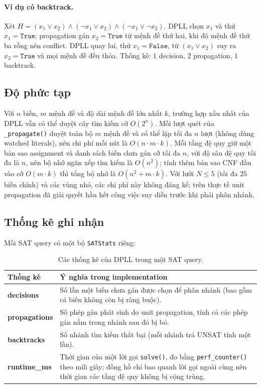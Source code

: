 \paragraph{Ví dụ có backtrack.}
Xét $H=(x_1\lor x_2)\land(\neg x_1\lor x_2)\land(\neg x_1\lor\neg x_2)$.
DPLL chọn $x_1$ và thử $x_1=\texttt{True}$; propagation gán $x_2=\texttt{True}$
từ mệnh đề thứ hai, khi đó mệnh đề thứ ba rỗng nên conflict. DPLL quay lui,
thử $x_1=\texttt{False}$, từ $(x_1\lor x_2)$ suy ra $x_2=\texttt{True}$ và
mọi mệnh đề đều thỏa. Thống kê: $1$ decision, $2$ propagation, $1$ backtrack.

\subsection{Độ phức tạp}
Với $n$ biến, $m$ mệnh đề và độ dài mệnh đề lớn nhất $k$, trường hợp xấu nhất
của DPLL vẫn có thể duyệt cây tìm kiếm cỡ $O(2^n)$. Mỗi lượt quét của
\texttt{\_propagate()} duyệt toàn bộ $m$ mệnh đề và có thể lặp tối đa $n$
lượt (không dùng watched literals), nên chi phí mỗi nút là $O(n\cdot m\cdot k)$.
Mỗi tầng đệ quy giữ một bản sao assignment và danh sách biến chưa gán cỡ tối
đa $n$, với độ sâu đệ quy tối đa là $n$, nên bộ nhớ ngăn xếp tìm kiếm là
$O(n^2)$; tính thêm bản sao CNF đầu vào cỡ $O(m\cdot k)$ thì tổng bộ nhớ là
$O(n^2 + m\cdot k)$. Với lưới $N\le 5$ (tối đa $25$ biến chính) và các vùng
nhỏ, các chi phí này không đáng kể; trên thực tế unit propagation đã giải
quyết hầu hết công việc suy diễn trước khi phải phân nhánh.

\subsection{Thống kê ghi nhận}
Mỗi SAT query có một bộ \texttt{SATStats} riêng:
\begin{table}[htbp]
\centering
\begin{tabularx}{\linewidth}{>{\bfseries}p{32mm}Y}
\toprule
Thống kê & Ý nghĩa trong implementation \\
\midrule
decisions & Số lần một biến chưa gán được chọn để phân nhánh (bao gồm cả
biến không còn bị ràng buộc). \\
propagations & Số phép gán phát sinh do unit propagation, tính cả các phép
gán nằm trong nhánh sau đó bị bỏ. \\
backtracks & Số nhánh tìm kiếm thất bại (mỗi nhánh trả UNSAT tính một lần). \\
runtime\_ms & Thời gian của một lời gọi \texttt{solve()}, đo bằng
\texttt{perf\_counter()} theo mili giây; đồng hồ chỉ bao quanh lời gọi ngoài
cùng nên thời gian các tầng đệ quy không bị cộng trùng. \\
\bottomrule
\end{tabularx}
\caption{Các thống kê của DPLL trong một SAT query.}
\label{tab:dpll-stats}
\end{table}

